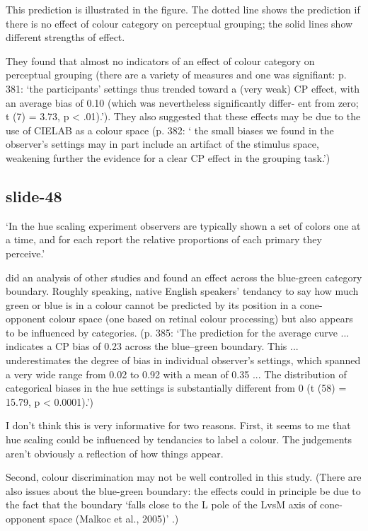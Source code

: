 \documentclass[12pt,\papersize]{extarticle}
\begin{document}
This prediction is illustrated in the figure.
The dotted line shows the prediction if there is no effect of colour category
on perceptual grouping; the solid lines show different strengths of effect.

They found that almost no indicators of an
effect of colour category on perceptual grouping
(there are a variety of measures and one was signifiant:
p. 381: ‘the participants’ settings thus trended toward a (very weak) CP effect,
with an average bias of 0.10 (which was nevertheless significantly differ-
ent from zero; t (7) = 3.73, p < .01).’).
They also suggested that these effects may be due to the use of
CIELAB as a colour space
(p. 382: ‘ the small biases we found in the observer’s settings may in part
include an artifact of the stimulus space, weakening further the evidence for a
clear CP effect in the grouping task.’)

\subsection{slide-48}
‘In the hue scaling experiment observers are typically shown a set
of colors one at a time, and for each report the relative proportions of each
primary they perceive.’

\citet{webster:2012_color} did an analysis of other studies and found
an effect across the blue-green category boundary.
Roughly speaking, native English speakers’ tendancy to say how much
green or blue is in a colour cannot be predicted by its position in a
cone-opponent colour space (one based on retinal colour processing)
but also appears to be influenced by categories.
(p. 385: ‘The prediction for the average curve ... indicates a CP bias of
0.23 across the blue–green boundary. This ... underestimates the degree of
bias in individual observer’s settings, which spanned a very wide range
from 0.02 to 0.92 with a mean of 0.35 ... The distribution of categorical
biases in the hue settings is substantially different from 0 (t (58) =
15.79, p < 0.0001).’)

I don’t think this is very informative for two reasons.
First, it seems to me that hue scaling could be influenced by tendancies to
label a colour. The judgements aren’t obviously a reflection of how things
appear.

Second, colour discrimination may not be well controlled in this study.
(There are also issues about the blue-green boundary: the effects could in
principle be due to the fact that the boundary ‘falls close to the L pole
of the LvsM axis of cone-opponent space (Malkoc et al., 2005)’
\citep[p.~388]{webster:2012_color} .)
\end{document}

